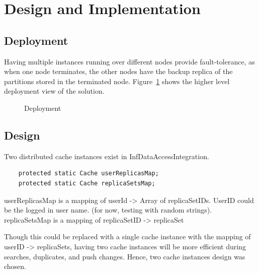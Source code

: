 \documentclass[conference]{IEEEtran}
\begin{document}
\section{Design and Implementation}
\subsection{Deployment}
Having multiple instances running over different nodes provide fault-tolerance, as when one node terminates, the other nodes have the backup replica of the partitions stored in the terminated node. Figure~\ref{fig:deployment} shows the higher level deployment view of the solution.
\begin{figure}[ht]
\begin{center}
\end{center}
 \caption{Deployment}
 \label{fig:deployment}
\end{figure}

\subsection{Design}
Two distributed cache instances exist in InfDataAccessIntegration.
\begin{lstlisting}  
    protected static Cache userReplicasMap;
    protected static Cache replicaSetsMap;
\end{lstlisting}  
userReplicasMap is a mapping of userId -> Array of replicaSetIDs. UserID could be the logged in user name. (for now, testing with random strings).
replicaSetsMap is a mapping of replicaSetID -> replicaSet

Though this could be replaced with a single cache instance with the mapping of userID -> replicaSets, having two cache instances will be more efficient during searches, duplicates, and push changes. Hence, two cache instances design was chosen.
\end{document}
